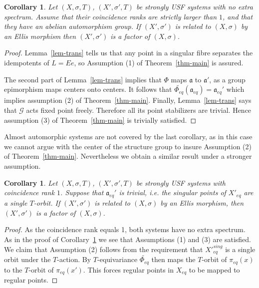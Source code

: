 \documentclass[10pt,a4paper]{amsart}
\newtheorem{cor}[theorem]{Corollary}
\numberwithin{equation}{section}
\newcommand{\Gg}{{\mathcal G}}
\newcommand{\Xe}{X_{eq}}
\newcommand{\aut}{{\mathfrak a}}
\newcommand{\aute}{\aut_{eq}}
\newcommand{\pe}{\pi_{eq}}
\newcommand{\tPhe}{\widetilde{\Phi_{eq}}}
\begin{document}
\begin{cor}\label{cor:fcr}
Let $(X,\sigma,T)$, $(X',\sigma',T)$ be  strongly USF systems with no extra spectrum.
Assume that their coincidence ranks are  strictly larger than $1$, and that they have an abelian automorphism group. If $(X',\sigma')$ is related to  $(X,\sigma)$ by an Ellis morphism then 
$(X',\sigma')$ is a factor of $(X,\sigma)$.
\end{cor}
\begin{proof}
Lemma~\ref{lem-trans} tells us that  any point in a  singular fibre separates the idempotents of $L=Ee$, so 
Assumption (1) of Theorem~\ref{thm-main} is assured.
  
The second part of  Lemma~\ref{lem-trans} implies that $\Phi$ maps $\aut$ to $\aut'$, as a group epimorphism maps centers onto centers. It follows that $\tPhe(\aute)=\aute'$ which implies assumption (2) of Theorem~\ref{thm-main}. 
Finally, Lemma~\ref{lem-trans} says that $\Gg$ acts fixed point freely. Therefore all its point stabilizers are trivial. Hence  assumption (3) of Theorem~\ref{thm-main} is trivially satisfied.
\end{proof}
Almost automorphic systems are not covered by the last corollary, as in this case we cannot argue with the center of the structure group to insure Assumption (2) of Theorem~\ref{thm-main}. Nevertheless we obtain a similar result under a stronger assumption.
\begin{cor}\label{cor:cr1}
Let $(X,\sigma,T)$, $(X',\sigma',T)$ be  strongly USF systems with coincidence rank $1$. 
 Suppose that  $\aute'$ is trivial, i.e. the singular points of $X'_{eq}$ are a single $T$-orbit. 
If $(X',\sigma')$ is related to $(X,\sigma)$ by an Ellis morphism, then $(X',\sigma')$ is a factor of $(X,\sigma)$.
\end{cor}
\begin{proof}
As the coincidence rank equals 1, both systems have no extra spectrum.  As in the proof of Corollary~\ref{cor:fcr} we see that Assumptions (1) and (3) are satisfied. 
 We claim that Assumption (2) follows from the requirement that  
${X'}_{eq}^{sing}$ is a single orbit under the $T$-action. By $T$-equivariance $\tPhe $ then maps the $T$-orbit of $\pe(x)$ to the $T$-orbit of $\pe(x')$. This forces regular points in $\Xe$ to be mapped to regular points. \end{proof}
\end{document}
